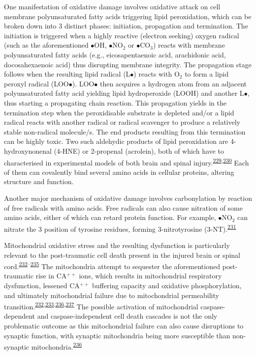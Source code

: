 \documentclass[
]{article}
\begin{document}
One manifestation of oxidative damage involves oxidative attack on cell membrane polyunsaturated fatty acids triggering lipid peroxidation, which can be broken down into 3 distinct phases: initiation, propagation and termination.
The initiation is triggered when a highly reactive (electron seeking) oxygen radical (such as the aforementioned \(\bullet\)OH, \(\bullet\)NO\(_2\) or \(\bullet\)CO\(_3\)) reacts with membrane polyunsaturated fatty acids (e.g., eicosapentaenoic acid, arachidonic acid, docosahexaenoic acid) thus disrupting membrane integrity.
The propagation stage follows when the resulting lipid radical (L\(\bullet\)) reacts with O\(_2\) to form a lipid peroxyl radical (LOO\(\bullet\)).
LOO\(\bullet\) then acquires a hydrogen atom from an adjacent polyunsaturated fatty acid yielding lipid hydroperoxide (LOOH) and another L\(\bullet\), thus starting a propagating chain reaction.
This propagation yields in the termination step when the peroxidisable substrate is depleted and/or a lipid radical reacts with another radical or radical scavenger to produce a relatively stable non-radical molecule/s.
The end products resulting from this termination can be highly toxic.
Two such aldehydic products of lipid peroxidation are 4-hydroxynonenal (4-HNE) or 2-propenal (acrolein), both of which have to characterised in experimental models of both brain and spinal injury.\textsuperscript{\protect\hyperlink{ref-bains_antioxidant_2012}{229},\protect\hyperlink{ref-hamann_acrolein_2009}{230}}
Each of them can covalently bind several amino acids in cellular proteins, altering structure and function.

Another major mechanism of oxidative damage involves carbonylation by reaction of free radicals with amino acids.
Free radicals can also cause nitration of some amino acids, either of which can retard protein function.
For example, \(\bullet\)NO\(_2\) can nitrate the 3 position of tyrosine residues, forming 3-nitrotyrosine (3-NT).\textsuperscript{\protect\hyperlink{ref-mustafa_mitochondrial_2010}{231}}

Mitochondrial oxidative stress and the resulting dysfunction is particularly relevant to the post-traumatic cell death present in the injured brain or spinal cord.\textsuperscript{\protect\hyperlink{ref-lifshitz_structural_2003}{232}--\protect\hyperlink{ref-sullivan_temporal_2007}{235}}
The mitochondria attempt to sequester the aforementioned post-traumatic rise in CA\(^{++}\) ions, which results in mitochondrial respiratory dysfunction, lessened CA\(^{++}\) buffering capacity and oxidative phosphorylation, and ultimately mitochondrial failure due to mitochondrial permeability transition.\textsuperscript{\protect\hyperlink{ref-lifshitz_structural_2003}{232},\protect\hyperlink{ref-singh_time_2006}{233},\protect\hyperlink{ref-sullivan_traumatic_1998}{236},\protect\hyperlink{ref-sullivan_mitochondrial_2005}{237}}
The possible activation of mitochondrial caspase-dependent and caspase-independent cell death cascades is not the only problematic outcome as this mitochondrial failure can also cause disruptions to synaptic function, with synaptic mitochondria being more susceptible than non-synaptic mitochondria.\textsuperscript{\protect\hyperlink{ref-sullivan_traumatic_1998}{236}}
\end{document}
